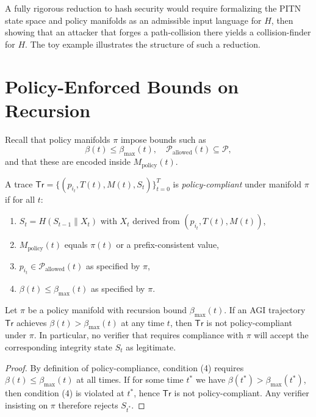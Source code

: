 \documentclass[11pt]{article}
\begin{document}
\begin{remark}
A fully rigorous reduction to hash security would require formalizing the PITN state space and policy manifolds as an admissible input language for \(H\), then showing that an attacker that forges a path-collision there yields a collision-finder for \(H\).
The toy example illustrates the structure of such a reduction.
\end{remark}

\section{Policy-Enforced Bounds on Recursion}

Recall that policy manifolds \(\pi\) impose bounds such as
\[
  \beta(t) \le \beta_{\max}(t),\quad
  \mathcal{P}_{\mathrm{allowed}}(t) \subseteq \mathcal{P},
\]
and that these are encoded inside \(M_{\mathrm{policy}}(t)\).

\begin{definition}
A trace \(\mathsf{Tr} = \{(p_{i_t}, T(t), M(t), S_t)\}_{t=0}^T\) is \emph{policy-compliant} under manifold \(\pi\) if for all \(t\):
\begin{enumerate}[leftmargin=1.5em]
  \item \(S_t = H(S_{t-1} \parallel X_t)\) with \(X_t\) derived from \((p_{i_t},T(t),M(t))\),
  \item \(M_{\mathrm{policy}}(t)\) equals \(\pi(t)\) or a prefix-consistent value,
  \item \(p_{i_t} \in \mathcal{P}_{\mathrm{allowed}}(t)\) as specified by \(\pi\),
  \item \(\beta(t) \le \beta_{\max}(t)\) as specified by \(\pi\).
\end{enumerate}
\end{definition}

\begin{lemma}
Let \(\pi\) be a policy manifold with recursion bound \(\beta_{\max}(t)\).
If an AGI trajectory \(\mathsf{Tr}\) achieves \(\beta(t) > \beta_{\max}(t)\) at any time \(t\), then \(\mathsf{Tr}\) is not policy-compliant under \(\pi\).
In particular, no verifier that requires compliance with \(\pi\) will accept the corresponding integrity state \(S_t\) as legitimate.
\end{lemma}

\begin{proof}
By definition of policy-compliance, condition (4) requires \(\beta(t) \le \beta_{\max}(t)\) at all times.
If for some time \(t^\ast\) we have \(\beta(t^\ast) > \beta_{\max}(t^\ast)\), then condition (4) is violated at \(t^\ast\), hence \(\mathsf{Tr}\) is not policy-compliant.
Any verifier insisting on \(\pi\) therefore rejects \(S_{t^\ast}\).
\end{proof}
\end{document}
